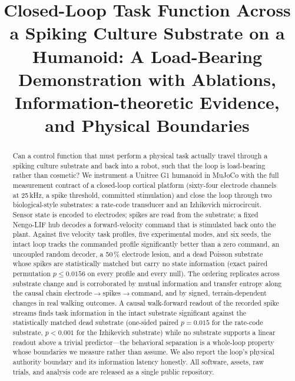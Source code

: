 ﻿%
%

\usepackage{cite}
\usepackage{amsmath,amsfonts,amssymb}
\usepackage{graphicx}
\usepackage{textcomp}
\usepackage{booktabs}
\usepackage{array}
\usepackage{multirow}
\usepackage{url}

\title{Closed-Loop Task Function Across a Spiking Culture Substrate on a
Humanoid: A Load-Bearing Demonstration with Ablations, Information-theoretic
Evidence, and Physical Boundaries}

\AuthorsBlock



\maketitle

\begin{abstract}
Can a control function that must perform a physical task actually travel
through a spiking culture substrate and back into a robot, such that the loop
is load-bearing rather than cosmetic? We instrument a Unitree G1 humanoid in
MuJoCo with the full measurement contract of a closed-loop cortical platform
(sixty-four electrode channels at 25\,kHz, a spike threshold, committed
stimulation) and close the loop through two biological-style substrates: a
rate-code transducer and an Izhikevich microcircuit. Sensor state is encoded
to electrodes; spikes are read from the substrate; a fixed Nengo-LIF hub
decodes a forward-velocity command that is stimulated back onto the plant.
Against five velocity task profiles, five experimental modes, and six seeds,
the intact loop tracks the commanded profile significantly better than a zero
command, an uncoupled random decoder, a 50\,\% electrode lesion, and a dead
Poisson substrate whose spikes are statistically matched but carry no state
information (exact paired permutation $p \leq 0.0156$ on every profile and
every null). The ordering replicates across substrate change and is
corroborated by mutual information and transfer entropy along the causal chain
electrode$\rightarrow$spikes$\rightarrow$command, and by signed,
terrain-dependent changes in real walking outcomes. A causal walk-forward
readout of the recorded spike streams finds task information in the intact
substrate significant against the statistically matched dead substrate
(one-sided paired $p=0.015$ for the rate-code substrate, $p<0.001$ for the
Izhikevich substrate) while no substrate supports a linear readout above a
trivial predictor---the behavioral separation is a whole-loop property whose
boundaries we measure rather than assume. We also report the loop's physical
authority boundary and its information latency honestly. All software, assets,
raw trials, and analysis code are released as a single public repository.
\end{abstract}

